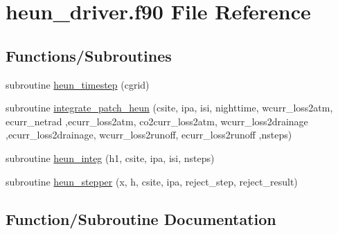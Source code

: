 \hypertarget{heun__driver_8f90}{}\section{heun\+\_\+driver.\+f90 File Reference}
\label{heun__driver_8f90}
\subsection*{Functions/\+Subroutines}
\begin{DoxyCompactItemize}
\item 
subroutine \hyperlink{heun__driver_8f90_a067e150fd769a8ee5ef7a3c93c096e8c}{heun\+\_\+timestep} (cgrid)
\item 
subroutine \hyperlink{heun__driver_8f90_a2020e0df05ff5e04a48f6a7adc08f39a}{integrate\+\_\+patch\+\_\+heun} (csite, ipa, isi, nighttime, wcurr\+\_\+loss2atm, ecurr\+\_\+netrad                                                                                                                                                   ,ecurr\+\_\+loss2atm, co2curr\+\_\+loss2atm, wcurr\+\_\+loss2drainage                                                                                                                                                   ,ecurr\+\_\+loss2drainage, wcurr\+\_\+loss2runoff, ecurr\+\_\+loss2runoff                                                                                                                                   ,nsteps)
\item 
subroutine \hyperlink{heun__driver_8f90_a45802ff14cf406c16fcd7cda4e7f9974}{heun\+\_\+integ} (h1, csite, ipa, isi, nsteps)
\item 
subroutine \hyperlink{heun__driver_8f90_a4af48931dac2e97dfe8e8637aba7ce25}{heun\+\_\+stepper} (x, h, csite, ipa, reject\+\_\+step, reject\+\_\+result)
\end{DoxyCompactItemize}


\subsection{Function/\+Subroutine Documentation}
